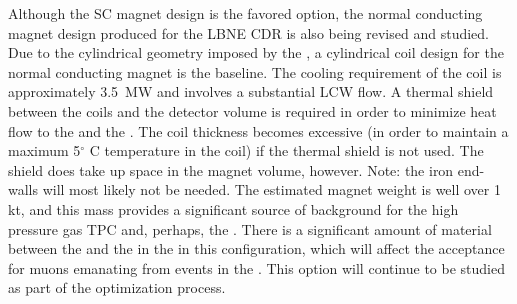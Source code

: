 Although the SC magnet design is the favored option, the normal conducting magnet design produced for the LBNE CDR is also being revised and studied.  Due to the cylindrical geometry imposed by the , a cylindrical coil design for the normal conducting magnet is the baseline. The cooling requirement of the coil is approximately \SI{3.5}{MW} and involves a substantial LCW flow. A thermal shield between the coils and the detector volume is required in order to minimize heat flow to the  and the . The coil thickness becomes excessive (in order to maintain a maximum 5$^\circ$ C temperature in the coil) if the thermal shield is not used.  The shield does take up space in the magnet volume, however.  %
Note: the iron end-walls will most likely not be needed. The estimated magnet weight is well over 1\,kt, and this mass provides a significant source of background for the high pressure gas TPC and, perhaps, the  .  There is a significant amount of material between the  and the  in the  in this configuration, which will affect the acceptance for muons emanating from events in the  . This option will continue to be studied as part of the optimization process.
%
%

    
